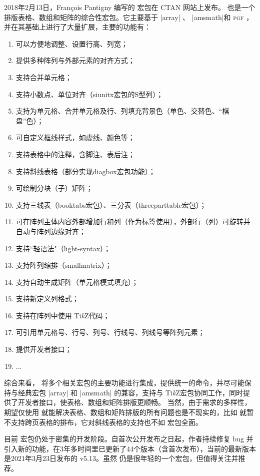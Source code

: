 \documentclass[dvipsnames]{article}%
\def\tikzname{Ti\emph{k}Z}
\begin{document}
2018年2月13日，François Pantigny 编写的  宏包在 CTAN 网站上发布。
 也是一个排版表格、数组和矩阵的综合性宏包。它主要基于 |array| 、 |amsmath|和 \textsc{pgf} ，并在其基础上进行了大量扩展，主要的功能有：

\begin{enumerate}[nosep,label = \textbullet ]
  \item 可以方便地调整、设置行高、列宽；
  \item 提供多种阵列与外部元素的对齐方式；
  \item 支持合并单元格；
  \item 支持小数点、单位对齐（siunitx宏包的S型列）；
  \item 支持为单元格、合并单元格及行、列填充背景色（单色、交替色、“棋盘”色）；
  \item 可自定义框线样式，如虚线、颜色等；
  \item 支持表格中的注释，含脚注、表后注；
  \item 支持斜线表格（部分实现diagbox宏包功能）；
  \item 可绘制分块（子）矩阵；
  \item 支持三线表（booktabs宏包）、三分表（threeparttable宏包）；
  \item 可在阵列主体内容外部增加行和列（作为标签使用），外部行（列）可旋转并自动与阵列边缘对齐；
  \item 支持“轻语法"（light-syntax）；
  \item 支持阵列缩排（smallmatrix）；
  \item 支持自动生成矩阵（单元格模式填充）；
  \item 支持新定义列格式；
  \item 支持在阵列中使用 \tikzname 代码；
  \item 可引用单元格号、行号、列号、行线号、列线号等阵列元素；
  \item 提供开发者接口；
  \item ...
\end{enumerate}

综合来看，  将多个相关宏包的主要功能进行集成，提供统一的命令，并尽可能保持与经典宏包 |array| 和 |amsmath| 的兼容，支持与 \tikzname 宏包协同工作，同时提供了开发者接口，使表格、数组和矩阵排版更顺畅。 当然，由于需求的多样性，期望仅使用  就能解决表格、数组和矩阵排版的所有问题也是不现实的，比如  就暂不支持跨页表格的排布，它对斜线表格的支持也不如  宏包全面。

目前  宏包仍处于密集的开发阶段。自首次公开发布之日起，作者持续修复 bug 并引入新的功能，在3年多时间里已更新了44个版本（含首次发布），当前的最新版本是2021年3月23日发布的 v5.13。虽然  仍是很年轻的一个宏包，但值得关注并推荐。
\end{document}
